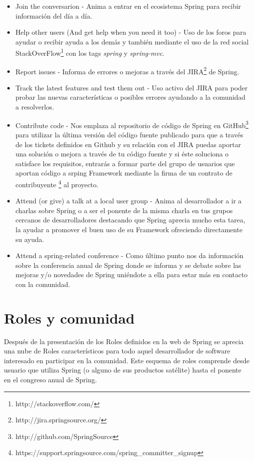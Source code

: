 \documentclass[11pt]{scrartcl}
\begin{document}
\begin{itemize}
    \item Join the conversarion - Anima a entrar en el ecosistema Spring para recibir informaci\'on del d\'ia a d\'ia.
    \item Help other users (And get help when you need it too) - Uso de los foros para ayudar o recibir ayuda a los dem\'as y tambi\'en mediante el uso de la red social StackOverFlow\footnote{http://stackoverflow.com/} con los tags \emph{spring} y \emph{spring-mvc}.
    \item Report issues - Informa de errores o mejoras a trav\'es del JIRA\footnote{http://jira.springsource.org/} de Spring.
    \item Track the latest features and test them out - Uso activo del JIRA para poder probar las nuevas caracter\'isticas o posibles errores ayudando a la comunidad a resolverlos.
    \item Contribute code - Nos emplaza al repositorio de c\'odigo de Spring en GitHub\footnote{http://github.com/SpringSource} para utilizar la \'ultima versi\'on del c\'odigo fuente publicado para que a trav\'es de los tickets definidos en Github y su relaci\'on con el JIRA puedas aportar una soluci\'on o mejora a trav\'es de tu c\'odigo fuente y si \'este soluciona o satisface los requisitos, entrar\'as a formar parte del grupo de usuarios que aportan c\'odigo a srping Framework mediante la firma de un contrato de contribuyente \footnote{https://support.springsource.com/spring\_committer\_signup} al proyecto.
    \item Attend (or give) a talk at a local user group - Anima al desarrollador a ir a charlas sobre Spring o a ser el ponente de la misma charla en tus grupos cercanos de desarrolladores destacando que Spring aprecia mucho esta tarea, la ayudar a promover el buen uso de su Framework ofreciendo directamente su ayuda.
    \item Attend a spring-related conference - Como \'ultimo punto nos da informaci\'on sobre la conferencia anual de Spring donde se informa y se debate sobre las mejoras y/o novedades de Spring uni\'endote a ella para estar m\'as en contacto con la comunidad.
\end{itemize}

\section{Roles y comunidad}

Despu\'es de la presentaci\'on de los Roles definidos en la web de Spring se aprecia una nube de Roles caracter\'isticos para todo aquel desarrollador de software interesado en participar en la comunidad. Este esquema de roles comprende desde usuario que utiliza Spring (o alguno de sus productos sat\'elite) hasta el ponente en el congreso anual de Spring.
\end{document}
